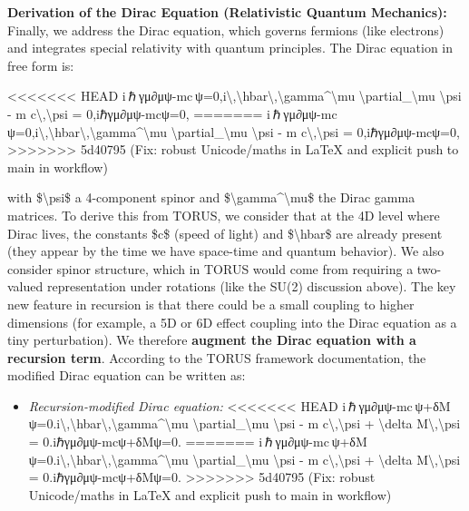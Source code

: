 \documentclass[]{article}
\begin{document}
\textbf{Derivation of the Dirac Equation (Relativistic Quantum
Mechanics):} Finally, we address the Dirac equation, which governs
fermions (like electrons) and integrates special relativity with quantum
principles. The Dirac equation in free form is:

<<<<<<< HEAD
i ℏ γμ∂μψ-mc ψ=0,i\textbackslash,\textbackslash hbar\textbackslash,\textbackslash gamma\^{}\textbackslash mu
\textbackslash partial\_\textbackslash mu \textbackslash psi - m
c\textbackslash,\textbackslash psi = 0,iℏγμ∂μ\hspace{0pt}ψ-mcψ=0,
=======
i ℏ γμ∂μψ-mc ψ=0,i\textbackslash{},\textbackslash{}hbar\textbackslash{},\textbackslash{}gamma\^{}\textbackslash{}mu
\textbackslash{}partial\_\textbackslash{}mu \textbackslash{}psi - m
c\textbackslash{},\textbackslash{}psi = 0,iℏγμ∂μ​ψ-mcψ=0,
>>>>>>> 5d40795 (Fix: robust Unicode/maths in LaTeX and explicit push to main in workflow)

with \$\textbackslash{}psi\$ a 4-component spinor and
\$\textbackslash{}gamma\^{}\textbackslash{}mu\$ the Dirac gamma
matrices. To derive this from TORUS, we consider that at the 4D level
where Dirac lives, the constants \$c\$ (speed of light) and
\$\textbackslash{}hbar\$ are already present (they appear by the time we
have space-time and quantum behavior). We also consider spinor
structure, which in TORUS would come from requiring a two-valued
representation under rotations (like the SU(2) discussion above). The
key new feature in recursion is that there could be a small coupling to
higher dimensions (for example, a 5D or 6D effect coupling into the
Dirac equation as a tiny perturbation). We therefore \textbf{augment the
Dirac equation with a recursion term}. According to the TORUS framework
documentation, the modified Dirac equation can be written as​:

\begin{itemize}
\item
  \emph{Recursion-modified Dirac equation:}
<<<<<<< HEAD
  i ℏ γμ∂μψ-mc ψ+δM ψ=0.i\textbackslash,\textbackslash hbar\textbackslash,\textbackslash gamma\^{}\textbackslash mu
  \textbackslash partial\_\textbackslash mu \textbackslash psi - m
  c\textbackslash,\textbackslash psi + \textbackslash delta
  M\textbackslash,\textbackslash psi = 0.iℏγμ∂μ\hspace{0pt}ψ-mcψ+δMψ=0.
=======
  i ℏ γμ∂μψ-mc ψ+δM ψ=0.i\textbackslash{},\textbackslash{}hbar\textbackslash{},\textbackslash{}gamma\^{}\textbackslash{}mu
  \textbackslash{}partial\_\textbackslash{}mu \textbackslash{}psi - m
  c\textbackslash{},\textbackslash{}psi + \textbackslash{}delta
  M\textbackslash{},\textbackslash{}psi = 0.iℏγμ∂μ​ψ-mcψ+δMψ=0.
>>>>>>> 5d40795 (Fix: robust Unicode/maths in LaTeX and explicit push to main in workflow)
\end{itemize}
\end{document}
